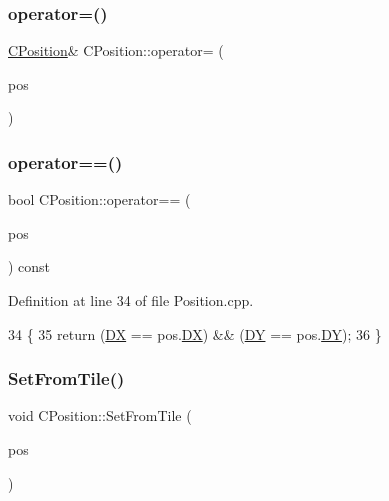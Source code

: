 \subsubsection{\texorpdfstring{operator=()}{operator=()}}
{\footnotesize\ttfamily \hyperlink{classCPosition}{C\+Position}\& C\+Position\+::operator= (\begin{DoxyParamCaption}\item[{const \hyperlink{classCPosition}{C\+Position} \&}]{pos }\end{DoxyParamCaption})\hspace{0.3cm}{\ttfamily [default]}}

\hypertarget{classCPosition_a301bf0382358092233b9cdd663677ee8}{}\label{classCPosition_a301bf0382358092233b9cdd663677ee8} 
\subsubsection{\texorpdfstring{operator==()}{operator==()}}
{\footnotesize\ttfamily bool C\+Position\+::operator== (\begin{DoxyParamCaption}\item[{const \hyperlink{classCPosition}{C\+Position} \&}]{pos }\end{DoxyParamCaption}) const}



Definition at line 34 of file Position.\+cpp.


\begin{DoxyCode}
34                                                     \{
35     \textcolor{keywordflow}{return} (\hyperlink{classCPosition_a28445f9b872169715919074d82044eda}{DX} == pos.\hyperlink{classCPosition_a28445f9b872169715919074d82044eda}{DX}) && (\hyperlink{classCPosition_a84139c9e8eb547e7cf3cb851739943a4}{DY} == pos.\hyperlink{classCPosition_a84139c9e8eb547e7cf3cb851739943a4}{DY});
36 \}
\end{DoxyCode}
\hypertarget{classCPosition_a46994e6a8b8e3b4237edd7259ad844b6}{}\label{classCPosition_a46994e6a8b8e3b4237edd7259ad844b6} 
\subsubsection{\texorpdfstring{Set\+From\+Tile()}{SetFromTile()}}
{\footnotesize\ttfamily void C\+Position\+::\+Set\+From\+Tile (\begin{DoxyParamCaption}\item[{const \hyperlink{classCPosition}{C\+Position} \&}]{pos }\end{DoxyParamCaption})}



